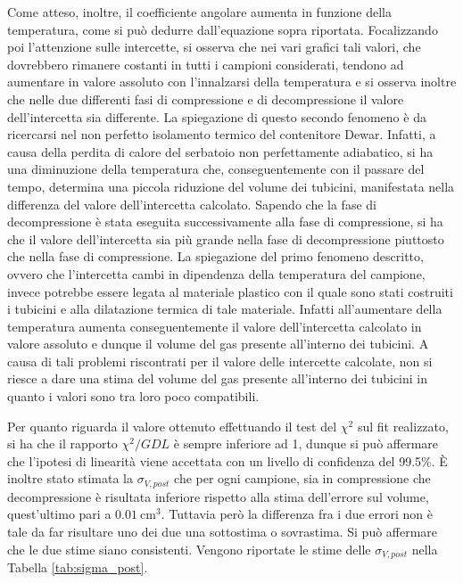 \documentclass[a4paper,11pt,oneside]{article}
\begin{document}
Come atteso, inoltre, il coefficiente angolare aumenta in funzione della temperatura, come si può dedurre dall'equazione sopra riportata.
Focalizzando poi l'attenzione sulle intercette, si osserva che nei vari grafici tali valori, che dovrebbero rimanere costanti in tutti i campioni considerati, tendono ad aumentare in valore assoluto con l'innalzarsi della temperatura e si osserva inoltre che nelle due differenti fasi di compressione e di decompressione il valore dell'intercetta sia differente. La spiegazione di questo secondo fenomeno è da ricercarsi nel non perfetto isolamento termico del contenitore Dewar. Infatti, a causa della perdita di calore del serbatoio non perfettamente adiabatico, si ha una diminuzione della temperatura che, conseguentemente con il passare del tempo, determina una piccola riduzione del volume dei tubicini, manifestata nella differenza del valore dell'intercetta calcolato. Sapendo che la fase di decompressione è stata eseguita successivamente alla fase di compressione, si ha che il valore dell'intercetta sia più grande nella fase di decompressione piuttosto che nella fase di compressione. La spiegazione del primo fenomeno descritto, ovvero che l'intercetta cambi in dipendenza della temperatura del campione, invece potrebbe essere legata al materiale plastico con il quale sono stati costruiti i tubicini e alla dilatazione termica di tale materiale. Infatti all'aumentare della temperatura aumenta conseguentemente il valore dell'intercetta calcolato in valore assoluto e dunque il volume del gas presente all'interno dei tubicini. A causa di tali problemi riscontrati per il valore delle intercette calcolate, non si riesce a dare una stima del volume del gas presente all'interno dei tubicini in quanto i valori sono tra loro poco compatibili. 

Per quanto riguarda il valore ottenuto effettuando il test del $\chi^2$ sul fit realizzato, si ha che il rapporto $\chi^2/GDL$ è sempre inferiore ad 1, dunque si può affermare che l'ipotesi di linearità viene accettata con un livello di confidenza del 99.5\%.
È inoltre stato stimata la $\sigma_{V, post}$ che per ogni campione, sia in compressione che decompressione è risultata inferiore rispetto alla stima dell'errore sul volume, quest'ultimo pari a $\SI{0.01}{\centi\meter\cubed}$. Tuttavia però la differenza fra i due errori non è tale da far risultare uno dei due una sottostima o sovrastima. Si può affermare che le due stime siano consistenti. Vengono riportate le stime delle $\sigma_{V, post}$ nella Tabella \ref{tab:sigma_post}.
\end{document}
